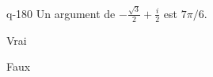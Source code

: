 \begin{truefalse}{q-180}
Un argument de $-\frac{\sqrt 3}{2}+\frac{i}{2}$ est $7\pi/6$.
\item Vrai
\item* Faux
\end{truefalse}

